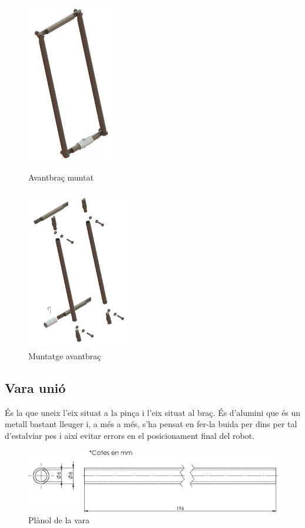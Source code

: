 \documentclass[a4paper, 12pt]{article}
\begin{document}
\begin{figure}[h!]
\begin{minipage}[b]{.45\linewidth}
\centering
\includegraphics[height=7cm]{./imgComp/avant}
\caption{Avantbraç muntat}
\end{minipage}
\begin{minipage}[b]{.45\linewidth}
\centering
\includegraphics[height=7cm]{./imgComp/avant_expl}
\caption{Muntatge avantbraç}
\end{minipage}
\end{figure}

\subsection{Vara unió}
És la que uneix l'eix situat a la pinça i l'eix situat al braç. És d'alumini que és un metall bastant lleuger i, a més a més, s'ha pensat en fer-la buida per dins per tal d'estalviar pes i així evitar errors en el posicionament final del robot.
\begin{figure}[h!]
\centering
\includegraphics[width=15cm]{./sketch/vara}
\caption{Plànol de la vara}
\end{figure}
\end{document}
